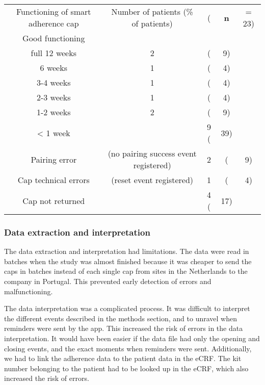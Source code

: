\documentclass{article}
\begin{document}
\begin{table}

  
\begin{tabular}{c  c  c  c  c}

  Functioning of smart adherence cap & Number of patients (\% of patients) & ( & \textbf{n} &  = 23)\\
Good functioning\\
 full 12 weeks &  2  & ( & 9)\\
 6 weeks &  1  & ( & 4)\\
 3-4 weeks &  1  & ( & 4)\\
 2-3 weeks &  1  & ( & 4)\\
 1-2 weeks &  2  & ( & 9)\\
 < 1 week &   & 9 ( & 39)\\
Pairing error  & (no pairing success event registered) &  2  & ( & 9)\\
Cap technical errors  & (reset event registered) &  1  & ( & 4)\\
Cap not returned &   & 4 ( & 17)\\


\end{tabular}


\end{table}


\subsubsection{Data extraction and interpretation}

The data extraction and interpretation had limitations. The data were read in batches when the study was almost finished because it was cheaper to send the caps in batches instead of each single cap from sites in the Netherlands to the company in Portugal. This prevented early detection of errors and malfunctioning. 



The data interpretation was a complicated process. It was difficult to interpret the different events described in the methods section, and to unravel when reminders were sent by the app. This increased the risk of errors in the data interpretation. It would have been easier if the data file had only the opening and closing events, and the exact moments when reminders were sent. Additionally, we had to link the adherence data to the patient data in the eCRF. The kit number belonging to the patient had to be looked up in the eCRF, which also increased the risk of errors. 
\end{document}
